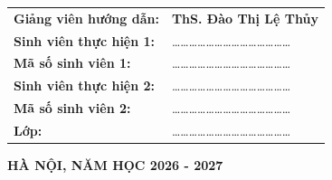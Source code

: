 \begin{titlepage}
\begin{center}
    \begin{minipage}{0.9\textwidth}
        \fontsize{13pt}{16pt}\selectfont
        \begin{tabular}{p{5.5cm}l}
            \textbf{Giảng viên hướng dẫn:} & \textbf{ThS. Đào Thị Lệ Thủy} \\[3mm]
            \textbf{Sinh viên thực hiện 1:} & \dots\dots\dots\dots\dots\dots\dots\dots\dots\dots\dots\dots\dots\dots \\[2mm]
            \textbf{Mã số sinh viên 1:}     & \dots\dots\dots\dots\dots\dots\dots\dots\dots\dots\dots\dots\dots\dots \\[2mm]
            \textbf{Sinh viên thực hiện 2:} & \dots\dots\dots\dots\dots\dots\dots\dots\dots\dots\dots\dots\dots\dots \\[2mm]
            \textbf{Mã số sinh viên 2:}     & \dots\dots\dots\dots\dots\dots\dots\dots\dots\dots\dots\dots\dots\dots \\[2mm]
            \textbf{Lớp:}                  & \dots\dots\dots\dots\dots\dots\dots\dots\dots\dots\dots\dots\dots\dots \\
        \end{tabular}
    \end{minipage}

    \vfill
    {\fontsize{13pt}{15pt}\selectfont \textbf{HÀ NỘI, NĂM HỌC 2026 - 2027}}
\end{center}
\end{titlepage}

